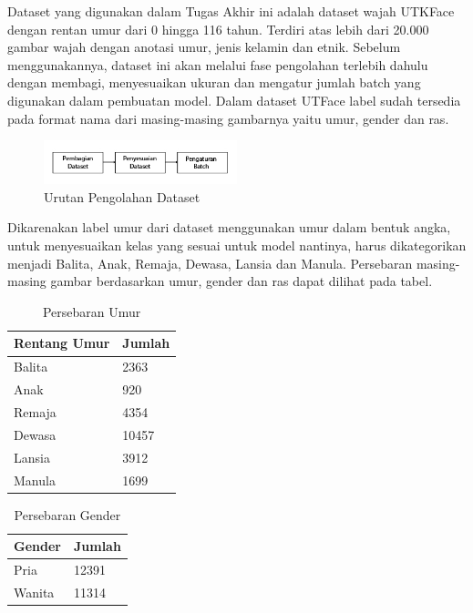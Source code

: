 Dataset yang digunakan dalam Tugas Akhir ini adalah dataset wajah UTKFace dengan rentan umur dari 0 hingga 116 tahun. 
Terdiri atas lebih dari 20.000 gambar wajah dengan anotasi umur, jenis kelamin dan etnik. Sebelum menggunakannya,
dataset ini akan melalui fase pengolahan terlebih dahulu dengan membagi, menyesuaikan ukuran dan mengatur jumlah batch
yang digunakan dalam pembuatan model.  
Dalam dataset UTFace label sudah tersedia pada format nama dari masing-masing gambarnya yaitu umur, gender dan ras.

\begin{figure} [ht]
  \centering
  \includegraphics[width=0.5\textwidth]{gambar/dataset.jpg}

  \caption{Urutan Pengolahan Dataset}
  \label{fig:pengolahandataset}
\end{figure}

Dikarenakan label umur dari dataset menggunakan umur dalam bentuk angka, untuk menyesuaikan
kelas yang sesuai untuk model nantinya, harus dikategorikan menjadi Balita, Anak, Remaja, Dewasa, Lansia dan Manula. 
Persebaran masing-masing gambar berdasarkan umur, gender dan ras dapat dilihat pada tabel.

\begin{table}
  \caption{Persebaran Umur}
  \label{tab:persebaranumur}
  \centering
  \begin{tabular}{ll}
    \toprule
    \textbf{Rentang Umur} & \textbf{Jumlah} \\
    \midrule
    Balita           & 2363           \\
    Anak             & 920            \\ 
    Remaja           & 4354           \\ 
    Dewasa           & 10457          \\ 
    Lansia           & 3912           \\ 
    Manula           & 1699           \\
    \bottomrule
  \end{tabular}
\end{table}

\begin{table}
  \caption{Persebaran Gender}
  \label{tab:persebarangender}
  \centering
  \begin{tabular}{ll}
    \toprule
    \textbf{Gender} & \textbf{Jumlah} \\
    \midrule
    Pria           & 12391           \\
    Wanita         & 11314           \\
    \bottomrule
  \end{tabular}
\end{table}

